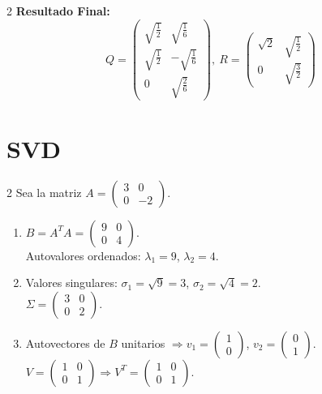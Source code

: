 \documentclass[10pt]{extarticle}
\begin{document}
\begin{multicols}{2}
\textbf{Resultado Final:}
$$Q=\begin{pmatrix}\sqrt{\frac12}&\sqrt{\frac16}\\\sqrt{\frac12}&-\sqrt{\frac16}\\0&\sqrt{\frac26}\end{pmatrix},\ R=\begin{pmatrix}\sqrt{2}&\sqrt{\frac12}\\0&\sqrt{\frac32}\end{pmatrix}$$

\end{multicols}

\section*{SVD}
\begin{multicols}{2}
Sea la matriz $A = \begin{pmatrix}3&0\\0&-2\end{pmatrix}$.

\begin{enumerate}
\item $B = A^TA = \begin{pmatrix}9&0\\0&4\end{pmatrix}$. \\ Autovalores ordenados: $\lambda_1=9$, $\lambda_2=4$.
\item Valores singulares: $\sigma_1=\sqrt9=3$, $\sigma_2=\sqrt4=2$. \\ $\Sigma=\begin{pmatrix}3&0\\0&2\end{pmatrix}$.
\item Autovectores de $B$ unitarios $\Rightarrow v_1=\begin{pmatrix}1\\0\end{pmatrix}$, $v_2=\begin{pmatrix}0\\1\end{pmatrix}$. \\ $V=\begin{pmatrix}1&0\\0&1\end{pmatrix} \Rightarrow V^T=\begin{pmatrix}1&0\\0&1\end{pmatrix}$.
\end{enumerate}


\end{multicols}
\end{document}
